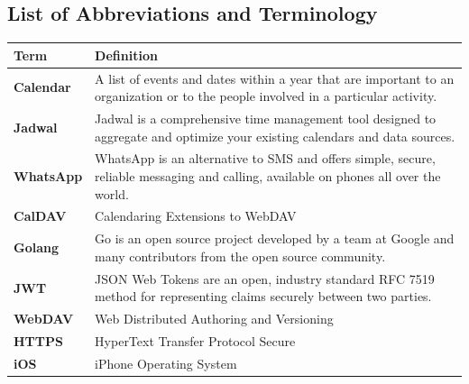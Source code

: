 \documentclass[12pt,a4paper]{report}
\begin{document}
\begin{singlespace}
\newpage

\tableofcontents

\newpage
\listoffigures

\newpage

\chapter*{List of Abbreviations and Terminology}

\begin{center}
    \begin{longtable}{p{}p{}}
    \toprule
    \textbf{Term} & \textbf{Definition} \\
    \midrule
    \endhead
    
    \textbf{Calendar} & A list of events and dates within a year that are important to an organization or to the people involved in a particular activity. \cite{def:calendar} \\[1ex]
    
    \textbf{Jadwal} & Jadwal is a comprehensive time management tool designed to aggregate and optimize your existing calendars and data sources. \\[1ex]
    
    \textbf{WhatsApp} & WhatsApp is an alternative to SMS and offers simple, secure, reliable messaging and calling, available on phones all over the world. \cite{whatsapp-about} \\[1ex]
    
    \textbf{CalDAV} & Calendaring Extensions to WebDAV \\[1ex]
    
    \textbf{Golang} & Go is an open source project developed by a team at Google and many contributors from the open source community. \cite{def:Golang}\\[1ex]
    
    \textbf{JWT} & JSON Web Tokens are an open, industry standard RFC 7519 method for representing claims securely between two parties. \cite{def:JWT}\\[1ex]
    
    \textbf{WebDAV} & Web Distributed Authoring and Versioning \\[1ex]
    
    \textbf{HTTPS} & HyperText Transfer Protocol Secure \\[1ex]
    
    \textbf{iOS} & iPhone Operating System \\[1ex]
    

\end{longtable}
\end{center}
\end{singlespace}
\end{document}
